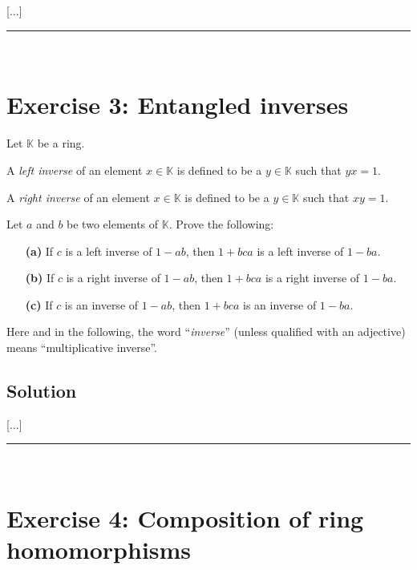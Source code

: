 \documentclass[paper=a4, fontsize=12pt]{scrartcl} %
\newcommand{\KK}{\mathbb{K}} %
\newcommand{\horrule}[1]{\rule{\linewidth}{#1}} %
\theoremstyle{plainsl}
\theoremstyle{definition}
\theoremstyle{remark}
\begin{document}
[...]

\horrule{0.3pt} \\[0.4cm]

\section{Exercise 3: Entangled inverses}

Let $\KK$ be a ring.

A \textit{left inverse} of an element $x \in \KK$
is defined to be a $y \in \KK$ such that $yx = 1$.

A \textit{right inverse} of an element $x \in \KK$
is defined to be a $y \in \KK$ such that $xy = 1$.

Let $a$ and $b$ be two elements of $\KK$.
Prove the following:

\begin{enumerate}

\item[\textbf{(a)}] If $c$ is a left inverse of $1 - ab$,
then $1 + bca$ is a left inverse of $1 - ba$.

\item[\textbf{(b)}] If $c$ is a right inverse of $1 - ab$,
then $1 + bca$ is a right inverse of $1 - ba$.

\item[\textbf{(c)}] If $c$ is an inverse of $1 - ab$,
then $1 + bca$ is an inverse of $1 - ba$.

\end{enumerate}

Here and in the following, the word ``\textit{inverse}''
(unless qualified with an adjective) means
``multiplicative inverse''.

\subsection{Solution}

[...]

\horrule{0.3pt} \\[0.4cm]

\section{Exercise 4: Composition of ring homomorphisms}
\end{document}
